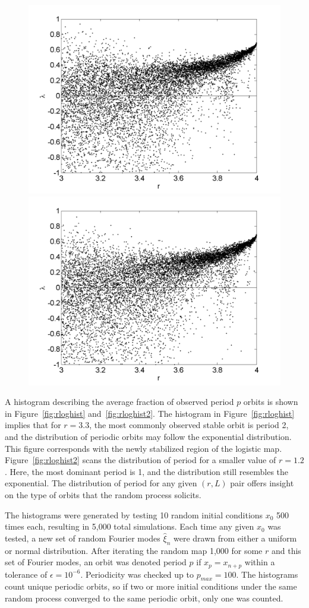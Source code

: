 \begin{figure}[!h]
\includegraphics[width=.5\textwidth]{figs/rlog_lyap_L_07.png}\hfill
\includegraphics[width=.5\textwidth]{figs/rlog_lyap_L_09.png}\\
\end{figure}

A histogram describing the average fraction of observed period $p$
orbits is shown in Figure~\ref{fig:rloghist}
and~\ref{fig:rloghist2}. The histogram in Figure~\ref{fig:rloghist} implies
that for $r=3.3$, the most commonly observed stable orbit is period 2, and the
distribution of periodic orbits may follow the exponential
distribution. This figure corresponds with the newly stabilized region
of the logistic map. Figure~\ref{fig:rloghist2} scans the distribution
of period for a smaller value of $r=1.2$. Here, the most dominant
period is 1, and the distribution still resembles the exponential. The distribution of period for any given $(r,L)$ pair
offers insight on the type of orbits that the random process solicits.

The histograms were generated by testing 10 random initial conditions $x_0$ 500 times
each, resulting in 5,000 total simulations. Each time any given $x_0$
was tested, a new set of random Fourier modes $\hat{\xi}_n$ were drawn
from either a uniform or normal distribution. After iterating the random
map 1,000 for some $r$ and this set of Fourier modes, an orbit was denoted period $p$ if $x_p = x_{n+p}$ within a
tolerance of $\epsilon = 10^{-6}$. Periodicity was checked up to
$p_{max}=100$. The histograms count unique periodic orbits, so if two
or more initial conditions under the same random process converged to the same periodic orbit, only
one was counted. 

